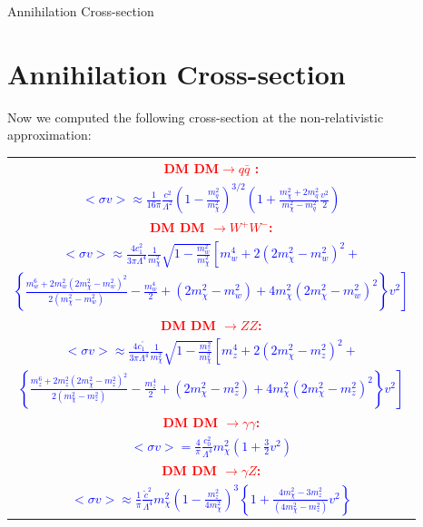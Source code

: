\documentclass[11pt]{beamer}
\begin{document}
\begin{frame}{Annihilation Cross-section}
\section{Annihilation Cross-section}
Now we computed the following cross-section at the non-relativistic approximation:


\begin{tiny}

\begin{tabular}{|c|}
\hline
 \textcolor{red}{\textbf{DM DM$\longrightarrow q \bar{q}$ :}} \\ \textcolor{blue}{$<\sigma v > \approx \frac{1}{16 \pi} \frac{c^2}{\Lambda^2} (1-\frac{m_q^2}{m_\chi^2})^{3/2} 
\left(1+ \frac{m_\chi^2 +2m_q^2}{m_\chi^2-m_q^2} \frac{v^2}{2}\right) \label{qqcross}$} \\ \hline

\textcolor{red}{\textbf{DM DM $\longrightarrow W^+W^-$:}}  \\ \textcolor{blue}{$<\sigma v> \approx \frac{4c^2_1}{3 \pi \Lambda^4}  \frac{1}{m^2_\chi}  \sqrt{1-\frac{m^2_w}{m^2_\chi}} \left[ m^4_w + 2(2 m^2_\chi -m^2_w)^2 + \right. $} \\ 
 \textcolor{blue}{$ \left. \left\{ \frac{ m^6_w+2 m^2_w (2 m^2_\chi - m^2_w)^2 }{2(m^2_\chi - m^2_w)} -\frac{m^4_w}{2} + (2 m^2_\chi - m^2_w) + 4 m^2_\chi (2 m^2_\chi - m^2_w)^2 \right\} v^2  \right]  \label{wwcross} 
$} \\ \hline
 

\textcolor{red}{\textbf{DM DM $\longrightarrow ZZ$:}}\\  \textcolor{blue}{$<\sigma v> \approx \frac{4c^\prime_1}{3 \pi \Lambda^4}  \frac{1}{m^2_\chi}  \sqrt{1-\frac{m^2_z}{m^2_\chi}} \left[ m^4_z + 2(2 m^2_\chi -m^2_z)^2 + \right.$} \\ 
\textcolor{blue}{$\left. \left\{ \frac{ m^6_z+2 m^2_z (2 m^2_\chi - m^2_z)^2 }{2(m^2_\chi - m^2_z)} -\frac{m^4_z}{2} + (2 m^2_\chi - m^2_z) + 4 m^2_\chi (2 m^2_\chi - m^2_z)^2 \right\} v^2  \right] \label{zzcross}$} \\ \hline


\textcolor{red}{\textbf{DM DM $\longrightarrow \gamma \gamma$:}}\\
\textcolor{blue}{$<\sigma v> = \frac{4}{\pi} \frac{c^2_0}{\Lambda^4} m^2_\chi \left(1+\frac{3}{2} v^2 \right) \label{ggcross}$} \\ \hline


\textcolor{red}{\textbf{DM DM $\longrightarrow \gamma Z$:}} \\
\textcolor{blue}{$<\sigma v> \approx \frac{1}{\pi} \frac{\tilde{c}^2}{\Lambda^4} m^2_\chi \left( 1- \frac{m^2_z}{4 m^2_\chi} \right)^3 \left\{1 + \frac{4m^2_\chi - 3m^2_z}{(4m^2_\chi - m^2_z)} v^2\right\} \label{gzcross}$} \\ \hline
\end{tabular}


\end{tiny}

\end{frame}
\end{document}
